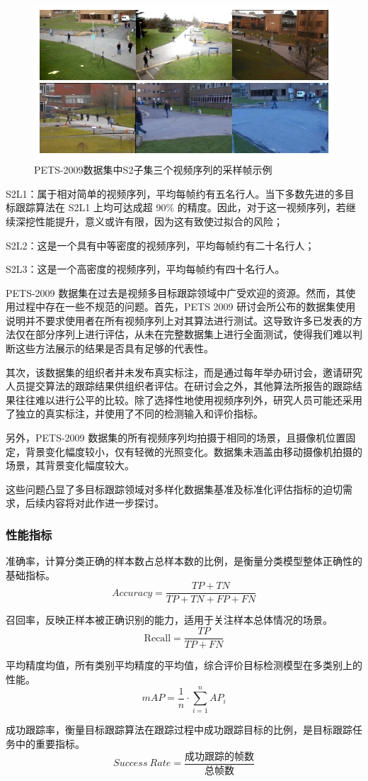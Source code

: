 \begin{figure}[htbp] %
	\centering
	\includegraphics[width=1\textwidth]{np102} %
	\caption{PETS-2009数据集中S2子集三个视频序列的采样帧示例} %
	\label{fig:np102} %
\end{figure}

S2L1：属于相对简单的视频序列，平均每帧约有五名行人。当下多数先进的多目标跟踪算法在 S2L1 上均可达成超 90\% 的精度。因此，对于这一视频序列，若继续深挖性能提升，意义或许有限，因为这有致使过拟合的风险；

S2L2：这是一个具有中等密度的视频序列，平均每帧约有二十名行人；

S2L3：这是一个高密度的视频序列，平均每帧约有四十名行人。

PETS-2009 数据集在过去是视频多目标跟踪领域中广受欢迎的资源。然而，其使用过程中存在一些不规范的问题。首先，PETS 2009 研讨会所公布的数据集使用说明并不要求使用者在所有视频序列上对其算法进行测试。这导致许多已发表的方法仅在部分序列上进行评估，从未在完整数据集上进行全面测试，使得我们难以判断这些方法展示的结果是否具有足够的代表性。

其次，该数据集的组织者并未发布真实标注，而是通过每年举办研讨会，邀请研究人员提交算法的跟踪结果供组织者评估。在研讨会之外，其他算法所报告的跟踪结果往往难以进行公平的比较。除了选择性地使用视频序列外，研究人员可能还采用了独立的真实标注，并使用了不同的检测输入和评价指标。

另外，PETS-2009 数据集的所有视频序列均拍摄于相同的场景，且摄像机位置固定，背景变化幅度较小，仅有轻微的光照变化。数据集未涵盖由移动摄像机拍摄的场景，其背景变化幅度较大。

这些问题凸显了多目标跟踪领域对多样化数据集基准及标准化评估指标的迫切需求，后续内容将对此作进一步探讨。

\subsubsection{性能指标}
准确率，计算分类正确的样本数占总样本数的比例，是衡量分类模型整体正确性的基础指标。
\[Accuracy = \frac{TP+TN}{TP+TN+FP+FN}\]

召回率，反映正样本被正确识别的能力，适用于关注样本总体情况的场景。
\[\text{Recall} = \frac{TP}{TP + FN}\]

平均精度均值，所有类别平均精度的平均值，综合评价目标检测模型在多类别上的性能。
\[mAP = \frac{1}{n} \cdot \sum_{i=1}^{n} AP_i\]

成功跟踪率，衡量目标跟踪算法在跟踪过程中成功跟踪目标的比例，是目标跟踪任务中的重要指标。
\[Success\ Rate = \frac{\text{成功跟踪的帧数}}{\text{总帧数}}\]